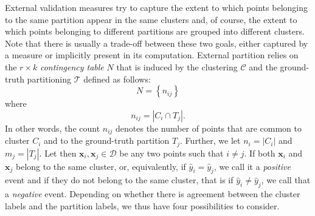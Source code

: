 \documentclass[a4paper]{article}
\begin{document}
	External validation measures try to capture the extent to which points belonging to the same partition appear in the same clusters and, of course, the extent to which points belonging to different partitions are grouped into different clusters. Note that there is usually a trade-off between these two goals, either captured by a measure or implicitly present in its computation.
	External partition relies on the $r \times k$ \textit{contingency table} $N$ that is induced by the clustering $\mathcal{C}$ and the ground-truth partitioning $\mathcal{T}$ defined as follows:
	\begin{equation*}
	N = \left\{ n_{ij} \right\}
	\end{equation*}
	where
	\begin{equation*}
	n_{ij} = | C_{i} \cap T_{j} |.
	\end{equation*}
	In other words, the count $n_{ij}$ denotes the number of points that are common to cluster $C_{i}$ and to the ground-truth partition $T_{j}$.
	Further, we let $n_{i} = \left| C_{i} \right|$ and $m_{j} = \left| T_{j} \right|$.
	Let then $\boldsymbol{x}_{i}, \boldsymbol{x}_{j} \in \mathcal{D}$ be any two points such that $i \neq j$. If both $\boldsymbol{x}_{i}$ and $\boldsymbol{x}_{j}$ belong to the same cluster, or, equivalently, if $\hat{y}_{i} = \hat{y}_{j}$, we call it a \textit{positive} event and if they do not belong to the same cluster, that is if $\hat{y}_{i} \neq \hat{y}_{j}$, we call that a \textit{negative} event. Depending on whether there is agreement between the cluster labels and the partition labels, we thus have four possibilities to consider.
\end{document}

